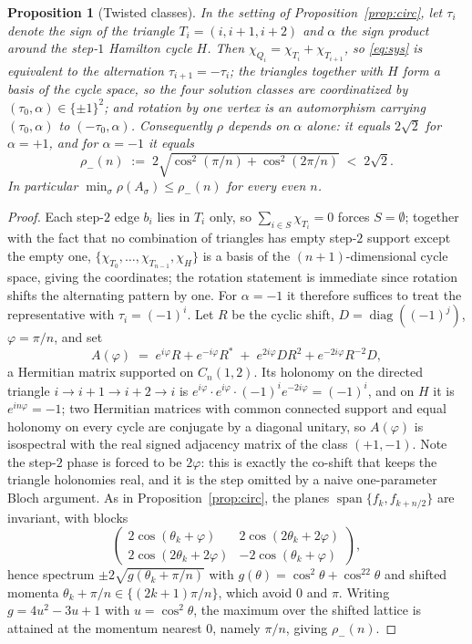 \documentclass[11pt]{article}
\newtheorem{proposition}[lemma]{Proposition}
\theoremstyle{remark}
\newcommand{\rhomax}{\rho}
\begin{document}
\begin{proposition}[Twisted classes]\label{prop:twist}
In the setting of Proposition~\ref{prop:circ}, let $\tau_i$ denote the
sign of the triangle $T_i=(i,i{+}1,i{+}2)$ and $\alpha$ the sign product
around the step-$1$ Hamilton cycle $H$. Then
$\chi_{Q_i}=\chi_{T_i}+\chi_{T_{i+1}}$, so \eqref{eq:sys} is equivalent
to the alternation $\tau_{i+1}=-\tau_i$; the triangles together with $H$
form a basis of the cycle space, so the four solution classes are
coordinatized by $(\tau_0,\alpha)\in\{\pm1\}^2$; and rotation by one
vertex is an automorphism carrying $(\tau_0,\alpha)$ to
$(-\tau_0,\alpha)$. Consequently $\rhomax$ depends on $\alpha$ alone: it
equals $2\sqrt2$ for $\alpha=+1$, and for $\alpha=-1$ it equals
\[
\rho_-(n)\;:=\;2\sqrt{\cos^2(\pi/n)+\cos^2(2\pi/n)}\;<\;2\sqrt2 .
\]
In particular $\min_\sigma\rhomax(A_\sigma)\le\rho_-(n)$ for every even
$n$.
\end{proposition}

\begin{proof}
Each step-$2$ edge $b_i$ lies in $T_i$ only, so
$\sum_{i\in S}\chi_{T_i}=0$ forces $S=\emptyset$; together with the fact
that no combination of triangles has empty step-$2$ support except the
empty one, $\{\chi_{T_0},\dots,\chi_{T_{n-1}},\chi_H\}$ is a basis of
the $(n{+}1)$-dimensional cycle space, giving the coordinates; the
rotation statement is immediate since rotation shifts the alternating
pattern by one. For $\alpha=-1$ it therefore suffices to treat the
representative with $\tau_i=(-1)^i$. Let $R$ be the cyclic shift,
$D=\operatorname{diag}((-1)^j)$, $\varphi=\pi/n$, and set
\[
A(\varphi)\;=\;e^{i\varphi}R+e^{-i\varphi}R^{*}
\;+\;e^{2i\varphi}DR^{2}+e^{-2i\varphi}R^{-2}D ,
\]
a Hermitian matrix supported on $C_n(1,2)$. Its holonomy on the directed
triangle $i\to i{+}1\to i{+}2\to i$ is
$e^{i\varphi}\cdot e^{i\varphi}\cdot(-1)^ie^{-2i\varphi}=(-1)^i$, and on
$H$ it is $e^{in\varphi}=-1$; two Hermitian matrices with common
connected support and equal holonomy on every cycle are conjugate by a
diagonal unitary, so $A(\varphi)$ is isospectral with the real signed
adjacency matrix of the class $(+1,-1)$. Note the step-$2$ phase is
forced to be $2\varphi$: this is exactly the co-shift that keeps the
triangle holonomies real, and it is the step omitted by a naive
one-parameter Bloch argument. As in Proposition~\ref{prop:circ}, the
planes $\operatorname{span}\{f_k,f_{k+n/2}\}$ are invariant, with blocks
\[
\begin{pmatrix}
2\cos(\theta_k{+}\varphi)&2\cos(2\theta_k{+}2\varphi)\\
2\cos(2\theta_k{+}2\varphi)&-2\cos(\theta_k{+}\varphi)
\end{pmatrix},
\]
hence spectrum $\pm2\sqrt{g(\theta_k+\pi/n)}$ with
$g(\theta)=\cos^2\theta+\cos^22\theta$ and shifted momenta
$\theta_k+\pi/n\in\{(2k{+}1)\pi/n\}$, which avoid $0$ and $\pi$. Writing
$g=4u^2-3u+1$ with $u=\cos^2\theta$, the maximum over the shifted
lattice is attained at the momentum nearest $0$, namely $\pi/n$, giving
$\rho_-(n)$.
\end{proof}
\end{document}
